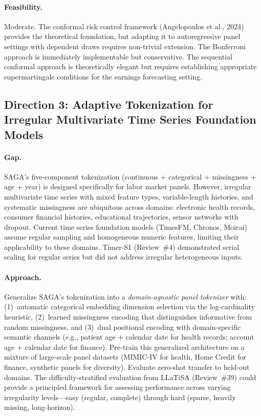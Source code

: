 \documentclass[11pt,a4paper]{article}
\begin{document}
\paragraph{Feasibility.}
Moderate. The conformal risk control framework (Angelopoulos et al., 2024) provides the theoretical foundation, but adapting it to autoregressive panel settings with dependent draws requires non-trivial extension. The Bonferroni approach is immediately implementable but conservative. The sequential conformal approach is theoretically elegant but requires establishing appropriate supermartingale conditions for the earnings forecasting setting.

\subsection*{Direction 3: Adaptive Tokenization for Irregular Multivariate Time Series Foundation Models}

\paragraph{Gap.}
SAGA's five-component tokenization (continuous + categorical + missingness + age + year) is designed specifically for labor market panels. However, irregular multivariate time series with mixed feature types, variable-length histories, and systematic missingness are ubiquitous across domains: electronic health records, consumer financial histories, educational trajectories, sensor networks with dropout. Current time series foundation models (TimesFM, Chronos, Moirai) assume regular sampling and homogeneous numeric features, limiting their applicability to these domains. Timer-S1 (Review~\#4) demonstrated serial scaling for regular series but did not address irregular heterogeneous inputs.

\paragraph{Approach.}
Generalize SAGA's tokenization into a \emph{domain-agnostic panel tokenizer} with: (1)~automatic categorical embedding dimension selection via the log-cardinality heuristic, (2)~learned missingness encoding that distinguishes informative from random missingness, and (3)~dual positional encoding with domain-specific semantic channels (e.g., patient age + calendar date for health records; account age + calendar date for finance). Pre-train this generalized architecture on a mixture of large-scale panel datasets (MIMIC-IV for health, Home Credit for finance, synthetic panels for diversity). Evaluate zero-shot transfer to held-out domains. The difficulty-stratified evaluation from LLaTiSA (Review~\#39) could provide a principled framework for assessing performance across varying irregularity levels---easy (regular, complete) through hard (sparse, heavily missing, long-horizon).
\end{document}
